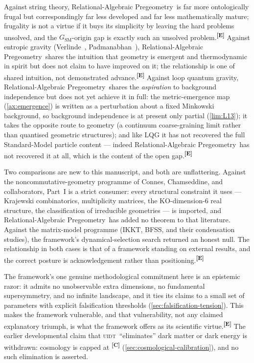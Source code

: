 \documentclass[12pt,a4paper,twoside]{article}
\theoremstyle{plain}
\theoremstyle{definition}
\theoremstyle{remark}
\newcommand{\ProjectShort}{Relational-Algebraic Pregeometry}
\newcommand{\RAP}{\ProjectShort}
\newcommand{\UIDT}{\textsc{uidt}} %
\newcommand{\catmark}[1]{\textsuperscript{\textsf{\textbf{[#1]}}}}
\begin{document}
Against string theory, \RAP\ is far more ontologically frugal but
correspondingly far less developed and far less mathematically mature;
frugality is not a virtue if it buys its simplicity by leaving the hard
problems unsolved, and the $G_{\mathrm{SM}}$-origin gap is exactly such
an unsolved problem.\catmark{E} Against entropic gravity
(Verlinde~\cite{verlinde2011}, Padmanabhan~\cite{padmanabhan2010}),
\RAP\ shares the intuition that geometry is emergent and thermodynamic
in spirit but does not claim to have improved on it; the relationship is
one of shared intuition, not demonstrated advance.\catmark{E} Against
loop quantum gravity, \RAP\ shares the \emph{aspiration} to background
independence but does not yet achieve it in full: the metric-emergence
map (\cref{ax:emergence}) is written as a perturbation about a fixed
Minkowski background, so background independence is at present only
partial (\cref{lim:L13}); it takes the opposite route to geometry (a
continuum coarse-graining limit rather than quantised geometric
structures); and like LQG it has not recovered the full Standard-Model
particle content --- indeed \RAP\ has not recovered it at all, which is
the content of the open gap.\catmark{E}

Two comparisons are new to this manuscript, and both are unflattering. Against
the noncommutative-geometry programme of Connes, Chamseddine, and
collaborators, Part~I is a strict consumer: every structural constraint
it uses --- Krajewski combinatorics, multiplicity matrices, the
KO-dimension-6 real structure, the classification of irreducible
geometries --- is imported, and \RAP\ has added no theorem to that
literature. Against the matrix-model programme (IKKT, BFSS, and their
condensation studies), the framework's dynamical-selection search
returned an honest null. The relationship in both cases is that of a
framework standing on external results, and the correct posture is
acknowledgement rather than positioning.\catmark{E}

The framework's one genuine methodological commitment here is an
epistemic razor: it admits no unobservable extra dimensions, no
fundamental supersymmetry, and no infinite landscape, and it ties its
claims to a small set of parameters with explicit falsification
thresholds (\cref{sec:falsification-tension}). This makes the framework
vulnerable, and that vulnerability, not any claimed explanatory triumph,
is what the framework offers as its scientific virtue.\catmark{E} The
earlier developmental claim that \UIDT\ ``eliminates'' dark matter or
dark energy is withdrawn: cosmology is capped at \catmark{C}
(\cref{sec:cosmological-calibration}), and no such elimination is
asserted.
\end{document}
